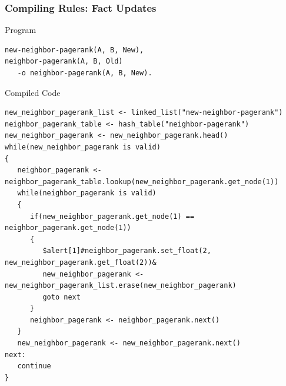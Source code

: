 \documentclass{beamer}
\begin{document}
\begin{frame}[fragile]
   \frametitle{Compiling Rules: Fact Updates}
     \begin{block}{Program}
       \begin{Verbatim}[fontsize=\tiny,commandchars=\\\{\},frame=single]
new-neighbor-pagerank(A, B, New),
neighbor-pagerank(A, B, Old)
   -o neighbor-pagerank(A, B, New).
\end{Verbatim}
\end{block}
   \begin{block}{Compiled Code}
\begin{Verbatim}[fontsize=\tiny,frame=single,commandchars=\$\#\&]
new_neighbor_pagerank_list <- linked_list("new-neighbor-pagerank")
neighbor_pagerank_table <- hash_table("neighbor-pagerank")
new_neighbor_pagerank <- new_neighbor_pagerank.head()
while(new_neighbor_pagerank is valid)
{
   neighbor_pagerank <- neighbor_pagerank_table.lookup(new_neighbor_pagerank.get_node(1))
   while(neighbor_pagerank is valid)
   {
      if(new_neighbor_pagerank.get_node(1) == neighbor_pagerank.get_node(1))
      {
         $alert[1]#neighbor_pagerank.set_float(2, new_neighbor_pagerank.get_float(2))&
         new_neighbor_pagerank <- new_neighbor_pagerank_list.erase(new_neighbor_pagerank)
         goto next
      }
      neighbor_pagerank <- neighbor_pagerank.next()
   }
   new_neighbor_pagerank <- new_neighbor_pagerank.next()
next:
   continue
}
\end{Verbatim}
   \end{block}
\end{frame}
\end{document}
